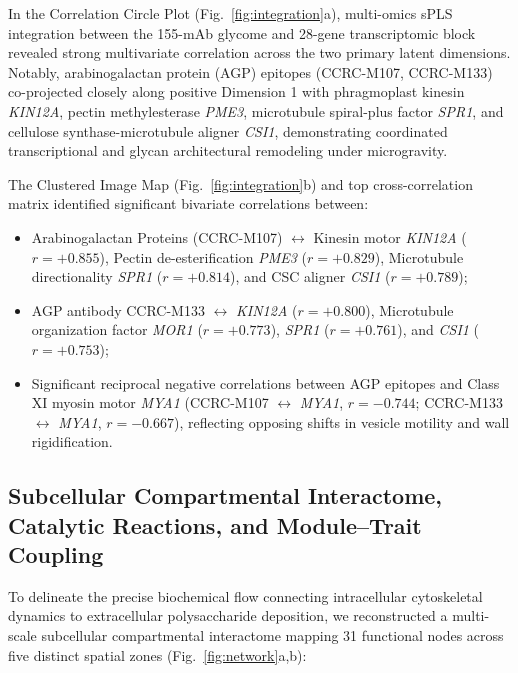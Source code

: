 In the Correlation Circle Plot (Fig.~\ref{fig:integration}a), multi-omics sPLS integration between the 155-mAb glycome and 28-gene transcriptomic block revealed strong multivariate correlation across the two primary latent dimensions. Notably, arabinogalactan protein (AGP) epitopes (CCRC-M107, CCRC-M133) co-projected closely along positive Dimension 1 with phragmoplast kinesin \textit{KIN12A}, pectin methylesterase \textit{PME3}, microtubule spiral-plus factor \textit{SPR1}, and cellulose synthase-microtubule aligner \textit{CSI1}, demonstrating coordinated transcriptional and glycan architectural remodeling under microgravity.

The Clustered Image Map (Fig.~\ref{fig:integration}b) and top cross-correlation matrix identified significant bivariate correlations between:
\begin{itemize}
    \item Arabinogalactan Proteins (CCRC-M107) $\longleftrightarrow$ Kinesin motor \textit{KIN12A} ($r = +0.855$), Pectin de-esterification \textit{PME3} ($r = +0.829$), Microtubule directionality \textit{SPR1} ($r = +0.814$), and CSC aligner \textit{CSI1} ($r = +0.789$);
    \item AGP antibody CCRC-M133 $\longleftrightarrow$ \textit{KIN12A} ($r = +0.800$), Microtubule organization factor \textit{MOR1} ($r = +0.773$), \textit{SPR1} ($r = +0.761$), and \textit{CSI1} ($r = +0.753$);
    \item Significant reciprocal negative correlations between AGP epitopes and Class XI myosin motor \textit{MYA1} (CCRC-M107 $\longleftrightarrow$ \textit{MYA1}, $r = -0.744$; CCRC-M133 $\longleftrightarrow$ \textit{MYA1}, $r = -0.667$), reflecting opposing shifts in vesicle motility and wall rigidification.
\end{itemize}

\subsection{Subcellular Compartmental Interactome, Catalytic Reactions, and Module--Trait Coupling}

To delineate the precise biochemical flow connecting intracellular cytoskeletal dynamics to extracellular polysaccharide deposition, we reconstructed a multi-scale subcellular compartmental interactome mapping 31 functional nodes across five distinct spatial zones (Fig.~\ref{fig:network}a,b):

